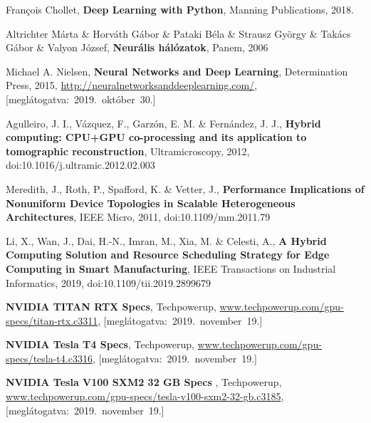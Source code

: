 \begin{thebibliography}{9}
	François Chollet,
	\textbf{Deep Learning with Python},
	Manning Publications,
	2018.

	Altrichter Márta \& Horváth Gábor \& Pataki Béla \& Strausz György \& Takács Gábor \& Valyon József,
	\textbf{Neurális hálózatok},
	Panem,
	2006


	Michael A. Nielsen,
	\textbf{Neural Networks and Deep Learning},
	Determination Press,
	2015,
	{\footnotesize\url{http://neuralnetworksanddeeplearning.com/}},
	\mbox{[meglátogatva:~2019.~október~30.]}

	Agulleiro, J. I., Vázquez, F., Garzón, E. M. \& Fernández, J. J., \textbf{Hybrid computing: CPU+GPU co-processing and its application to tomographic reconstruction},
	Ultramicroscopy,
	2012,
	doi:10.1016/j.ultramic.2012.02.003 

	Meredith, J., Roth, P., Spafford, K. \& Vetter, J.,
	\textbf{Performance Implications of Nonuniform Device Topologies in Scalable Heterogeneous Architectures},
	IEEE Micro,
	2011,
	doi:10.1109/mm.2011.79 

	Li, X., Wan, J., Dai, H.-N., Imran, M., Xia, M. \& Celesti, A.,
	\textbf{A Hybrid Computing Solution and Resource Scheduling Strategy for Edge Computing in Smart Manufacturing},
	IEEE Transactions on Industrial Informatics,
	2019,
	doi:10.1109/tii.2019.2899679

	\textbf{NVIDIA TITAN RTX Specs},
	Techpowerup,
	{\footnotesize\url{www.techpowerup.com/gpu-specs/titan-rtx.c3311}},
	\mbox{[meglátogatva:~2019.~november~19.]}

	\textbf{NVIDIA Tesla T4 Specs},
	Techpowerup,
	{\footnotesize\url{www.techpowerup.com/gpu-specs/tesla-t4.c3316}},
	\mbox{[meglátogatva:~2019.~november~19.]}

	\textbf{NVIDIA Tesla V100 SXM2 32 GB Specs },
	Techpowerup,
	{\footnotesize\url{www.techpowerup.com/gpu-specs/tesla-v100-sxm2-32-gb.c3185}},
	\mbox{[meglátogatva:~2019.~november~19.]}


\end{thebibliography}
